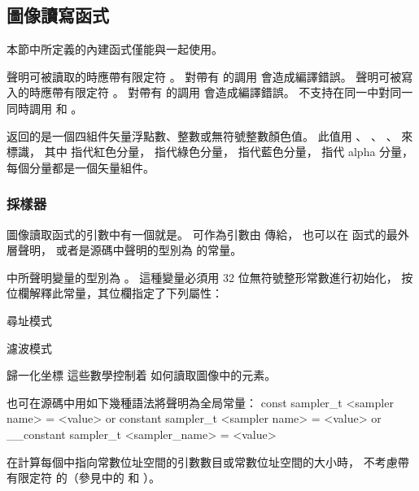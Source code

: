 \subsection[sec:imgRwFunc]{圖像讀寫函式}

本節中所定義的內建函式僅能與一起使用。

聲明可被讀取的時應帶有限定符 。
對帶有  的調用  會造成編譯錯誤。
聲明可被寫入的時應帶有限定符 。
對帶有  的調用  會造成編譯錯誤。
不支持在同一中對同一
同時調用  和 。

 返回的是一個四組件矢量浮點數、整數或無符號整數顏色值。
此值用 、 、 、  來標識，
其中  指代紅色分量，  指代綠色分量，  指代藍色分量，
  指代 alpha 分量，每個分量都是一個矢量組件。

\subsubsection[sec:samplerInImgRw]{採樣器}

圖像讀取函式的引數中有一個就是。
可作為引數由  傳給，
也可以在  函式的最外層聲明，
或者是源碼中聲明的型別為  的常量。

中所聲明變量的型別為 。
這種變量必須用 32 位無符號整形常數進行初始化，
按位欄解釋此常量，其位欄指定了下列屬性：
\startigBase[indentnext=no]
\item 尋址模式
\item 濾波模式
\item 歸一化坐標
\stopigBase
這些數學控制着  如何讀取圖像中的元素。

也可在源碼中用如下幾種語法將聲明為全局常量：
\startclc
const sampler_t		<sampler name> = <value>
or
constant sampler_t	<sampler name> = <value>
or
__constant sampler_t	<sampler_name> = <value>
\stopclc

\startnotepar
在計算每個中指向常數位址空間的引數數目或常數位址空間的大小時，
不考慮帶有限定符  的（參見中的
  和
 ）。
\stopnotepar

